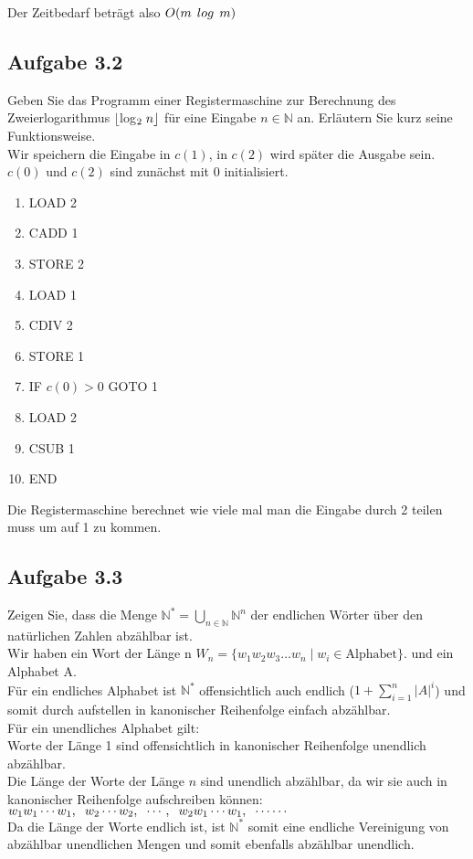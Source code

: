 Der Zeitbedarf beträgt also $O(m \hspace{0,15cm} log \hspace{0,15cm} m)$

\newpage

\subsection*{Aufgabe 3.2} Geben Sie das Programm einer Registermaschine zur Berechnung des Zweierlogarithmus $\lfloor $log$_2 \hspace{0,1cm} n \rfloor$ für eine Eingabe $n \in \mathbb{N}$ an. Erläutern Sie kurz seine Funktionsweise.\\

Wir speichern die Eingabe in $c(1)$, in $c(2)$ wird später die Ausgabe sein. $c(0)$ und $c(2)$ sind zunächst mit 0 initialisiert.
\begin{enumerate}
	\item LOAD 2
	\item CADD 1
	\item STORE 2
	\item LOAD 1
	\item CDIV 2
	\item STORE 1
	\item IF $c(0) > 0$ GOTO 1
	\item LOAD 2
	\item CSUB 1
	\item END
\end{enumerate}
Die Registermaschine berechnet wie viele mal man die Eingabe durch 2 teilen muss um auf 1 zu kommen.

\subsection*{Aufgabe 3.3}
Zeigen Sie, dass die Menge $\mathbb{N}^* = \bigcup_{n \in \mathbb{N}} \mathbb{N}^n$ der endlichen Wörter über den natürlichen Zahlen abzählbar ist.\\

Wir haben ein Wort der Länge n $W_n=\{w_1w_2w_3 \dots w_n \mid w_i \in \text{Alphabet}\}$. und ein Alphabet A.\\
Für ein endliches Alphabet ist $\mathbb{N}^*$ offensichtlich auch endlich ($1+\sum_{i=1}^{n}\left|A\right|^i$) und somit durch aufstellen in kanonischer Reihenfolge einfach abzählbar.\\
Für ein unendliches Alphabet gilt:\\
Worte der Länge 1 sind offensichtlich in kanonischer Reihenfolge unendlich abzählbar.\\
Die Länge der Worte der Länge $n$ sind unendlich abzählbar, da wir sie auch in kanonischer Reihenfolge aufschreiben können: $w_1w_1\cdots w_1, 
\hspace{0.2cm}w_2 \cdots w_2, 
\hspace{0.2cm}\cdots , 
\hspace{0.2cm}w_2 w_1 \cdots w_1, 
\hspace{0.2cm}\cdots \cdots$\\
Da die Länge der Worte endlich ist, ist $\mathbb{N}^*$ somit eine endliche Vereinigung von abzählbar unendlichen Mengen und somit ebenfalls abzählbar unendlich.


